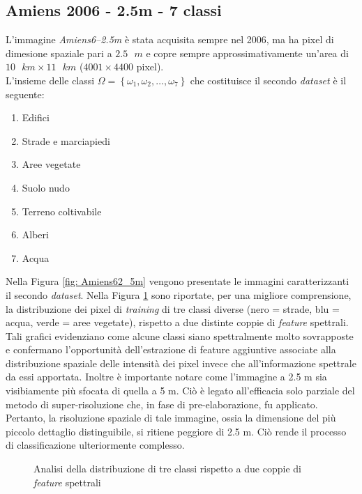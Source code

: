 \clearpage
\subsection{Amiens 2006 - 2.5m - 7 classi}
L'immagine \emph{Amiens6--2.5m} è stata acquisita sempre nel 2006, ma ha pixel di dimesione spaziale pari a $2.5\text{ }m$  e copre sempre approssimativamente un'area di $10\text{ }km\times11\text{ }km$ ($4001\times4400$ pixel).\\
L'insieme delle classi $\Omega=\left\lbrace\omega_1,\omega_2,\ldots,\omega_{7}\right\rbrace$ che costituisce il secondo \emph{dataset} è il seguente:
\begin{enumerate}
\item Edifici
\item Strade e marciapiedi
\item Aree vegetate
\item Suolo nudo
\item Terreno coltivabile
\item Alberi
\item Acqua
\end{enumerate}
Nella Figura \ref{fig: Amiens62_5m} vengono presentate le immagini caratterizzanti il secondo \emph{dataset}. Nella Figura \ref{fig:3classi} sono riportate, per una migliore comprensione, la distribuzione dei pixel di\emph{ training} di tre classi diverse (nero = strade, blu = acqua, verde = aree vegetate), rispetto a due distinte coppie di \emph{feature} spettrali. Tali grafici evidenziano come alcune classi siano spettralmente molto sovrapposte e confermano l'opportunità dell'estrazione di feature aggiuntive associate alla distribuzione spaziale delle intensità dei pixel invece che all'informazione spettrale da essi apportata. Inoltre è importante notare come l'immagine a 2.5 m sia visibiamente più sfocata di quella a 5 m. Ciò è legato all'efficacia solo parziale del metodo di super-risoluzione che, in fase di pre-elaborazione, fu applicato. Pertanto, la risoluzione spaziale di tale immagine, ossia la dimensione del più piccolo dettaglio distinguibile, si ritiene peggiore di 2.5 m. Ciò rende il processo di classificazione ulteriormente complesso.

 \begin{figure}[!ht]
\center  
{}
      \hspace{3mm}
		
    \caption{Analisi della distribuzione di tre classi rispetto a due coppie di \emph{feature} spettrali}
    \label{fig:3classi}
  \end{figure}


